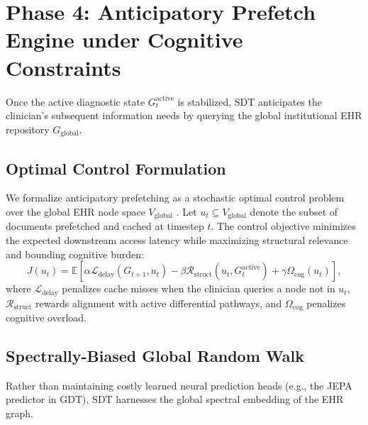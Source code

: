 \documentclass[10pt, onecolumn]{article}
\newcommand{\E}{\mathbb{E}}
\begin{document}
\section{Phase 4: Anticipatory Prefetch Engine under Cognitive Constraints}
\label{sec:phase4}

Once the active diagnostic state $G_t^{\text{active}}$ is stabilized, SDT anticipates the clinician's subsequent information needs by querying the global institutional EHR repository $G_{\text{global}}$.

\subsection{Optimal Control Formulation}

We formalize anticipatory prefetching as a stochastic optimal control problem over the global EHR node space $V_{\text{global}}$ \cite{bertsekas1995dynamic}. Let $u_t \subseteq V_{\text{global}}$ denote the subset of documents prefetched and cached at timestep $t$. The control objective minimizes the expected downstream access latency while maximizing structural relevance and bounding cognitive burden:
\begin{equation}
  J(u_t) = \E\!\left[ \alpha \mathcal{L}_{\text{delay}}(G_{t+1}, u_t) - \beta \mathcal{R}_{\text{struct}}(u_t, G_t^{\text{active}}) + \gamma \Omega_{\text{cog}}(u_t) \right],
  \label{eq:control_cost}
\end{equation}
where $\mathcal{L}_{\text{delay}}$ penalizes cache misses when the clinician queries a node not in $u_t$, $\mathcal{R}_{\text{struct}}$ rewards alignment with active differential pathways, and $\Omega_{\text{cog}}$ penalizes cognitive overload.

\subsection{Spectrally-Biased Global Random Walk}

Rather than maintaining costly learned neural prediction heads (e.g., the JEPA predictor in GDT), SDT harnesses the global spectral embedding of the EHR graph.
\end{document}
